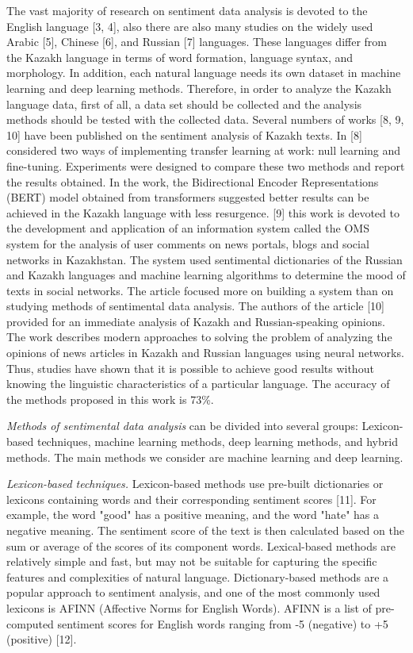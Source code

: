 The vast majority of research on sentiment data analysis is devoted to
the English language {[}3, 4{]}, also there are also many studies on the
widely used Arabic {[}5{]}, Chinese {[}6{]}, and Russian {[}7{]}
languages. These languages differ from the Kazakh language in terms of
word formation, language syntax, and morphology. In addition, each
natural language needs its own dataset in machine learning and deep
learning methods. Therefore, in order to analyze the Kazakh language
data, first of all, a data set should be collected and the analysis
methods should be tested with the collected data. Several numbers of
works {[}8, 9, 10{]} have been published on the sentiment analysis of
Kazakh texts. In {[}8{]} considered two ways of implementing transfer
learning at work: null learning and fine-tuning. Experiments were
designed to compare these two methods and report the results obtained.
In the work, the Bidirectional Encoder Representations (BERT) model
obtained from transformers suggested better results can be achieved in
the Kazakh language with less resurgence. {[}9{]} this work is devoted
to the development and application of an information system called the
OMS system for the analysis of user comments on news portals, blogs and
social networks in Kazakhstan. The system used sentimental dictionaries
of the Russian and Kazakh languages and machine learning algorithms to
determine the mood of texts in social networks. The article focused more
on building a system than on studying methods of sentimental data
analysis. The authors of the article {[}10{]} provided for an immediate
analysis of Kazakh and Russian-speaking opinions. The work describes
modern approaches to solving the problem of analyzing the opinions of
news articles in Kazakh and Russian languages using neural networks.
Thus, studies have shown that it is possible to achieve good results
without knowing the linguistic characteristics of a particular language.
The accuracy of the methods proposed in this work is 73\%.

\emph{Methods of sentimental data analysis} can be divided into several
groups: Lexicon-based techniques, machine learning methods, deep
learning methods, and hybrid methods. The main methods we consider are
machine learning and deep learning.

\emph{Lexicon-based techniques.} Lexicon-based methods use pre-built
dictionaries or lexicons containing words and their corresponding
sentiment scores {[}11{]}. For example, the word "good" has a positive
meaning, and the word "hate" has a negative meaning. The sentiment score
of the text is then calculated based on the sum or average of the scores
of its component words. Lexical-based methods are relatively simple and
fast, but may not be suitable for capturing the specific features and
complexities of natural language. Dictionary-based methods are a popular
approach to sentiment analysis, and one of the most commonly used
lexicons is AFINN (Affective Norms for English Words). AFINN is a list
of pre-computed sentiment scores for English words ranging from -5
(negative) to +5 (positive) {[}12{]}.

